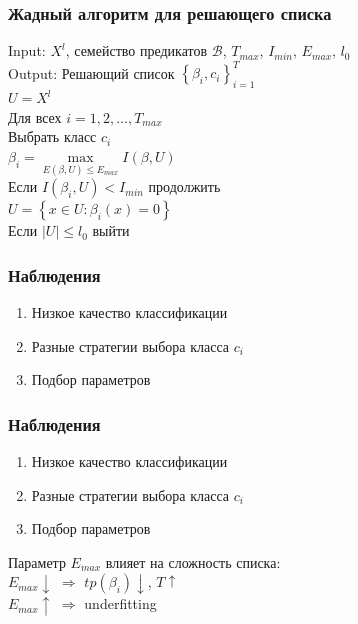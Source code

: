 \documentclass[12pt]{beamer}
\begin{document}
\begin{frame}\frametitle{Жадный алгоритм для решающего списка}
Input: $X^l$, семейство предикатов $\mathcal{B}$, $T_{max}$, $I_{min}$, $E_{max}$, $l_0$\\
Output: Решающий список $\left\{ \beta_i, c_i \right\}_{i=1}^T$\\
\vspace{5mm}
$U = X^l$\\
Для всех $i = 1,2,\dots,T_{max}$\\
\hspace{10mm} Выбрать класс $c_i$\\
\hspace{10mm} $\beta_i = \max\limits_{E(\beta, U) \leq E_{max}} I(\beta, U)$\\
\hspace{10mm} Если $I(\beta_i, U) < I_{min}$ продолжить\\
\hspace{10mm} $U = \left\{ x \in U: \beta_i(x) = 0 \right\}$\\
\hspace{10mm} Если $\vert U \vert \leq l_0$ выйти
\end{frame}

\begin{frame}\frametitle{Наблюдения}
\begin{enumerate}[--]
\item Низкое качество классификации
\item Разные стратегии выбора класса $c_i$
\item Подбор параметров
\end{enumerate}
\end{frame}

\begin{frame}\frametitle{Наблюдения}
\begin{enumerate}[--]
\item Низкое качество классификации
\item Разные стратегии выбора класса $c_i$
\item Подбор параметров
\end{enumerate}
\vspace{5mm}
Параметр $E_{max}$ влияет на сложность списка:\\
$E_{max} \downarrow$ $\Rightarrow$ $tp(\beta_i) \downarrow$, $T \uparrow$\\
$E_{max} \uparrow$ $\Rightarrow$ underfitting
\end{frame}
\end{document}
